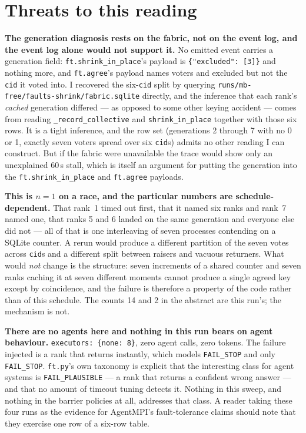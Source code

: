 \documentclass[11pt]{article}
\begin{document}
\section{Threats to this reading}

\textbf{The generation diagnosis rests on the fabric, not on the event log, and the event
log alone would not support it.} No emitted event carries a generation field:
\texttt{ft.shrink\_in\_place}'s payload is \texttt{\{"excluded": [3]\}} and nothing more,
and \texttt{ft.agree}'s payload names voters and excluded but not the \texttt{cid} it
voted into. I recovered the six-\texttt{cid} split by querying
\texttt{runs/mb-free/faults-shrink/fabric.sqlite} directly, and the inference that each
rank's \emph{cached} generation differed --- as opposed to some other keying accident ---
comes from reading \texttt{\_record\_collective} and \texttt{shrink\_in\_place} together
with those six rows. It is a tight inference, and the row set (generations 2 through 7
with no 0 or 1, exactly seven voters spread over six \texttt{cid}s) admits no other
reading I can construct. But if the fabric were unavailable the trace would show only an
unexplained 60\,s stall, which is itself an argument for putting the generation into the
\texttt{ft.shrink\_in\_place} and \texttt{ft.agree} payloads.

\textbf{This is $n=1$ on a race, and the particular numbers are schedule-dependent.} That
rank~1 timed out first, that it named six ranks and rank~7 named one, that ranks 5 and 6
landed on the same generation and everyone else did not --- all of that is one
interleaving of seven processes contending on a SQLite counter. A rerun would produce a
different partition of the seven votes across \texttt{cid}s and a different split between
raisers and vacuous returners. What would \emph{not} change is the structure: seven
increments of a shared counter and seven ranks caching it at seven different moments
cannot produce a single agreed key except by coincidence, and the failure is therefore a
property of the code rather than of this schedule. The counts 14 and 2 in the abstract are
this run's; the mechanism is not.

\textbf{There are no agents here and nothing in this run bears on agent behaviour.}
\texttt{executors: \{none: 8\}}, zero agent calls, zero tokens. The failure injected is a
rank that returns instantly, which models \texttt{FAIL\_STOP} and only
\texttt{FAIL\_STOP}. \texttt{ft.py}'s own taxonomy is explicit that the interesting class
for agent systems is \texttt{FAIL\_PLAUSIBLE} --- a rank that returns a confident wrong
answer --- and that no amount of timeout tuning detects it. Nothing in this sweep, and
nothing in the barrier policies at all, addresses that class. A reader taking these four
runs as the evidence for AgentMPI's fault-tolerance claims should note that they exercise
one row of a six-row table.
\end{document}
